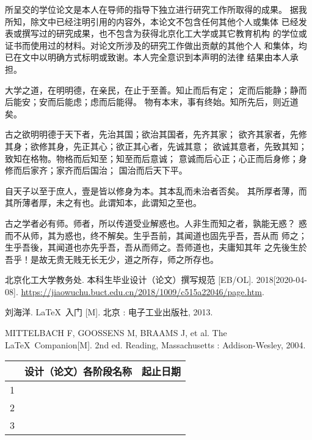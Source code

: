 \begin{declare}
所呈交的学位论文是本人在导师的指导下独立进行研究工作所取得的成果。
据我所知，除文中已经注明引用的内容外，本论文不包含任何其他个人或集体
已经发表或撰写过的研究成果，也不包含为获得北京化工大学或其它教育机构
的学位或证书而使用过的材料。对论文所涉及的研究工作做出贡献的其他个人
和集体，均已在文中以明确方式标明或致谢。本人完全意识到本声明的法律
结果由本人承担。
\end{declare}

\begin{taskbook}
\taskinfo		%
	
\taskitem			%

大学之道，在明明德，在亲民，在止于至善。知止而后有定；
定而后能静；静而后能安；安而后能虑；虑而后能得。
物有本末，事有终始。知所先后，则近道矣。

古之欲明明德于天下者，先治其国；欲治其国者，先齐其家；
欲齐其家者，先修其身；欲修其身，先正其心；欲正其心者，先诚其意；
欲诚其意者，先致其知；致知在格物。物格而后知至；知至而后意诚；
意诚而后心正；心正而后身修；身修而后家齐；家齐而后国治；
国治而后天下平。

自天子以至于庶人，壹是皆以修身为本。其本乱而未治者否矣。
其所厚者薄，而其所薄者厚，未之有也。此谓知本，此谓知之至也。
	
\taskitem			%

古之学者必有师。师者，所以传道受业解惑也。人非生而知之者，孰能无惑？
惑而不从师，其为惑也，终不解矣。生乎吾前，其闻道也固先乎吾，吾从而
师之；生乎吾後，其闻道也亦先乎吾，吾从而师之。吾师道也，夫庸知其年
之先後生於吾乎！是故无贵无贱无长无少，道之所存，师之所存也。
	
\taskitem			%
	\begin{bibenumerate}
		\item 北京化工大学教务处. 本科生毕业设计（论文）撰写规范 [EB/OL]. 2018[2020-04-08]. \url{https://jiaowuchu.buct.edu.cn/2018/1009/c515a22046/page.htm}.
		\item 刘海洋. \LaTeX\ 入门 [M]. 北京 : 电子工业出版社, 2013.
		\item MITTELBACH F, GOOSSENS M, BRAAMS J, et al. The \LaTeX\ Companion[M]. 2nd ed. Reading, Massachusetts : Addison-Wesley, 2004.
		\item 
	\end{bibenumerate}
	
\taskitem			%
	
	\begin{table}[H]
		\centering
		\begin{tabularx}{.95\textwidth}{p{1.5em}|X|p{6em}}
			\hline
					& 	设计（论文）各阶段名称		  &		起止日期	\\\hline
				1	& 								&				\\\hline
				2	&								&				\\\hline
				3	&								&				\\
			\hline
		\end{tabularx}
	\end{table}
\end{taskbook}


